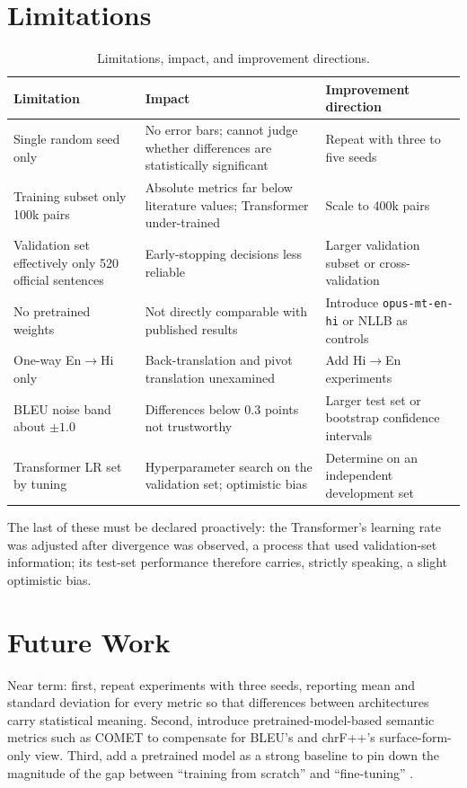 \documentclass[a4paper,12pt]{vpcoe}
\begin{document}
\section{Limitations}
\begin{table}[h]
\centering
\caption{Limitations, impact, and improvement directions.}
\label{tab:limits}
\begin{tabular}{@{}p{4.4cm}p{5.0cm}p{4.0cm}@{}}
\toprule
Limitation & Impact & Improvement direction \\
\midrule
Single random seed only & No error bars; cannot judge whether differences are statistically significant & Repeat with three to five seeds \\[3pt]
Training subset only 100k pairs & Absolute metrics far below literature values; Transformer under-trained & Scale to 400k pairs \\[3pt]
Validation set effectively only 520 official sentences & Early-stopping decisions less reliable & Larger validation subset or cross-validation \\[3pt]
No pretrained weights & Not directly comparable with published results & Introduce \texttt{opus-mt-en-hi} or NLLB as controls \\[3pt]
One-way En$\rightarrow$Hi only & Back-translation and pivot translation unexamined & Add Hi$\rightarrow$En experiments \\[3pt]
BLEU noise band about $\pm1.0$ & Differences below 0.3 points not trustworthy & Larger test set or bootstrap confidence intervals \\[3pt]
Transformer LR set by tuning & Hyperparameter search on the validation set; optimistic bias & Determine on an independent development set \\
\bottomrule
\end{tabular}
\end{table}

The last of these must be declared proactively: the Transformer's learning rate was adjusted after divergence was observed, a process that used validation-set information; its test-set performance therefore carries, strictly speaking, a slight optimistic bias.

\section{Future Work}
Near term: first, repeat experiments with three seeds, reporting mean and standard deviation for every metric so that differences between architectures carry statistical meaning. Second, introduce pretrained-model-based semantic metrics such as COMET to compensate for BLEU's and chrF++'s surface-form-only view. Third, add a pretrained model as a strong baseline to pin down the magnitude of the gap between ``training from scratch'' and ``fine-tuning'' \cite{nllb2022}.
\end{document}
